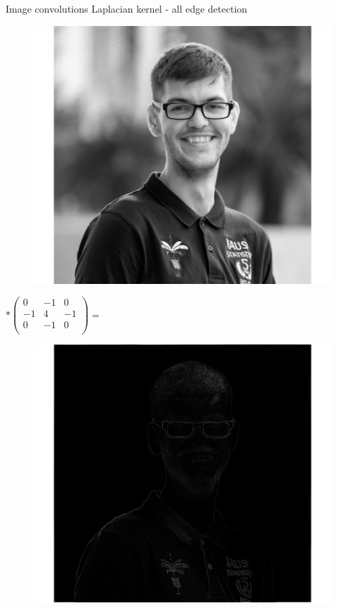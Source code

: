 \documentclass{beamer}
\begin{document}
\begin{frame}{Image convolutions}
Laplacian kernel - all edge detection

\begin{minipage}{0.32\linewidth}
\begin{figure}
\includegraphics[width=\linewidth]{Images/conv1.png}
\end{figure}

\end{minipage}
\begin{minipage}{0.32\linewidth}
$ * \begin{pmatrix}
0 & -1 & 0 \\
-1 & 4 & -1\\
0& -1 & 0\\
\end{pmatrix} =$
\end{minipage}
\begin{minipage}{0.32\linewidth}
\begin{figure}
\includegraphics[width=\linewidth]{Images/conv8.png}
\end{figure}
\end{minipage}
\end{frame}
\end{document}
